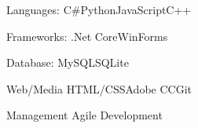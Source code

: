 

\begin{cvskills}

  \cvskill
    {Languages:} %
    {C\#{\enskip\cdotp\enskip}Python{\enskip\cdotp\enskip}JavaScript{\enskip\cdotp\enskip}C++} %

  \cvskill
    {Frameworks:} %
    {.Net Core{\enskip\cdotp\enskip}WinForms} %

  \cvskill
    {Database:} %
    {MySQL{\enskip\cdotp\enskip}SQLite} %

  \cvskill
    {Web/Media} %
    {HTML/CSS{\enskip\cdotp\enskip}Adobe CC{\enskip\cdotp\enskip}Git} %

  \cvskill
    {Management} %
    {Agile Development} %

\end{cvskills}

